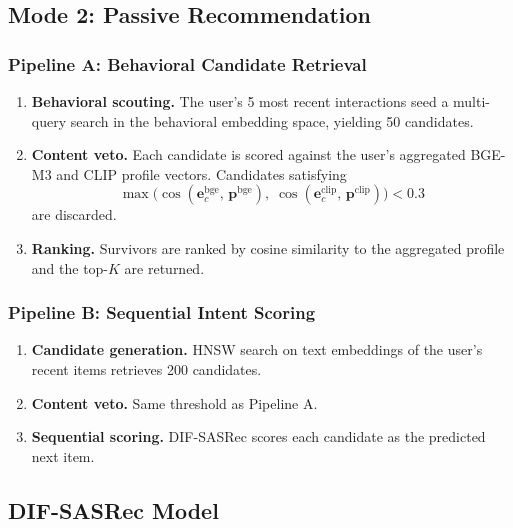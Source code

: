
\subsection{Mode 2: Passive Recommendation}
\label{ssec:passive}

\subsubsection{Pipeline A: Behavioral Candidate Retrieval}
\label{sssec:pipelineA}

\begin{enumerate}
  \item \textbf{Behavioral scouting.} The user's 5 most recent interactions
        seed a multi-query search in the behavioral embedding space, yielding 50 candidates.
  \item \textbf{Content veto.} Each candidate is scored against the user's
        aggregated BGE-M3 and CLIP profile vectors.
        Candidates satisfying
        \[
          \max\!\bigl(
            \cos(\mathbf{e}^{\text{bge}}_c,\,\mathbf{p}^{\text{bge}}),\;
            \cos(\mathbf{e}^{\text{clip}}_c,\,\mathbf{p}^{\text{clip}})
          \bigr) < 0.3
        \]
        are discarded.
  \item \textbf{Ranking.} Survivors are ranked by cosine similarity to the
        aggregated profile and the top-$K$ are returned.
\end{enumerate}

\subsubsection{Pipeline B: Sequential Intent Scoring}
\label{sssec:pipelineB}

\begin{enumerate}
  \item \textbf{Candidate generation.} HNSW search on text embeddings of
        the user's recent items retrieves 200 candidates.
  \item \textbf{Content veto.} Same threshold as Pipeline A.
  \item \textbf{Sequential scoring.} DIF-SASRec scores each candidate as the
        predicted next item.
\end{enumerate}


\subsection{DIF-SASRec Model}
\label{ssec:difsasrec}

